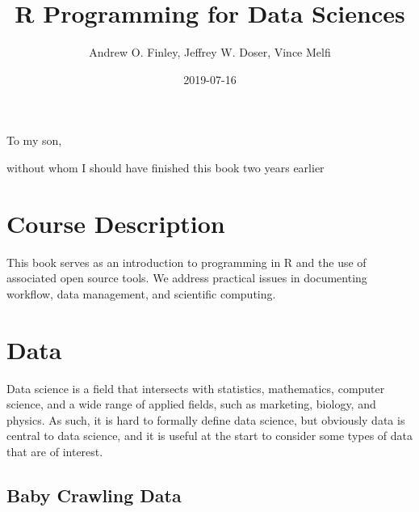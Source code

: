 \documentclass[]{krantz}
\title{R Programming for Data Sciences}
\author{Andrew O. Finley, Jeffrey W. Doser, Vince Melfi}
\date{2019-07-16}
\begin{document}
\maketitle


\thispagestyle{empty}

\begin{center}
To my son,

without whom I should have finished this book two years earlier
\end{center}

\setlength{\abovedisplayskip}{-5pt}
\setlength{\abovedisplayshortskip}{-5pt}

{
\hypersetup{linkcolor=black}
\setcounter{tocdepth}{2}
\tableofcontents
}
\listoftables
\listoffigures
\chapter*{Course Description}\label{course-description}


This book serves as an introduction to programming in R and the use of
associated open source tools. We address practical issues in documenting
workflow, data management, and scientific computing.

\mainmatter

\chapter{Data}\label{data}

Data science is a field that intersects with statistics, mathematics,
computer science, and a wide range of applied fields, such as marketing,
biology, and physics. As such, it is hard to formally define data
science, but obviously data is central to data science, and it is useful
at the start to consider some types of data that are of interest.

\section{Baby Crawling Data}\label{baby-crawling-data}
\end{document}
